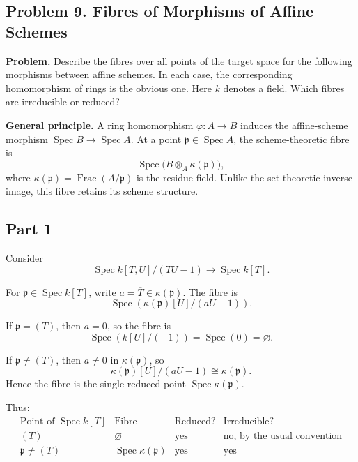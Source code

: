 
\subsection*{Problem 9. Fibres of Morphisms of Affine Schemes}

\textbf{Problem.}
Describe the fibres over all points of the target space for the following
morphisms between affine schemes. In each case, the corresponding
homomorphism of rings is the obvious one. Here \(k\) denotes a field.
Which fibres are irreducible or reduced?

\textbf{General principle.} A ring homomorphism \(\varphi:A\to B\) induces the affine-scheme morphism \(\operatorname{Spec}B\to\operatorname{Spec}A\). At a point \(\mathfrak p\in\operatorname{Spec}A\), the scheme-theoretic fibre is
\[
\operatorname{Spec}\bigl(B\otimes_A\kappa(\mathfrak p)\bigr),
\]
where \(\kappa(\mathfrak p)=\operatorname{Frac}(A/\mathfrak p)\) is the residue field. Unlike the set-theoretic inverse image, this fibre retains its scheme structure.

\subsection{Part 1}

Consider
\[
\operatorname{Spec} k[T,U]/(TU-1)
\longrightarrow
\operatorname{Spec} k[T].
\]

For \(\mathfrak p\in\operatorname{Spec}k[T]\), write \(a=\overline T\in\kappa(\mathfrak p)\). The fibre is
\[
\operatorname{Spec}
\left(
\kappa(\mathfrak{p})[U]/(aU-1)
\right).
\]

If \(\mathfrak{p}=(T)\), then \(a=0\), so the fibre is
\[
\operatorname{Spec}\left(k[U]/(-1)\right)
=
\operatorname{Spec}(0)
=
\varnothing.
\]

If \(\mathfrak{p}\neq (T)\), then \(a\neq 0\) in \(\kappa(\mathfrak{p})\),
so
\[
\kappa(\mathfrak{p})[U]/(aU-1)
\cong
\kappa(\mathfrak{p}).
\]
Hence the fibre is the single reduced point \(\operatorname{Spec}\kappa(\mathfrak p)\).

Thus:
\[
\begin{array}{c|c|c|c}
	\text{Point of } \operatorname{Spec}k[T]
	&
	\text{Fibre}
	&
	\text{Reduced?}
	&
	\text{Irreducible?}
	\\
	\hline
	(T)
	&
	\varnothing
	&
	\text{yes}
	&
	\text{no, by the usual convention}
	\\
	\mathfrak{p}\neq (T)
	&
	\operatorname{Spec}\kappa(\mathfrak{p})
	&
	\text{yes}
	&
	\text{yes}
\end{array}
\]

